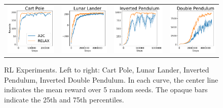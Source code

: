 \documentclass{article}
\begin{document}
\begin{figure}[!htb]
\centering
\hspace*{-.8in}
\begin{tabular}{cccc}
\setlength{\tabcolsep}{10pt}
\renewcommand{\arraystretch}{0}
\includegraphics[width=.28\linewidth]{figures/cp_paper} & 
\includegraphics[width=.27\linewidth]{figures/ll_paper} &
\includegraphics[width=.29\linewidth]{figures/ip_paper} & 
\includegraphics[width=.27\linewidth]{figures/idp_paper}\\
 \end{tabular}
\caption{RL Experiments. Left to right: Cart Pole, Lunar Lander, Inverted Pendulum, Inverted Double Pendulum. In each curve, the center line indicates the mean reward over 5 random seeds. The opaque bars indicate the 25th and 75th percentiles.}
\label{fig:rl_results}
\end{figure}
\end{document}
